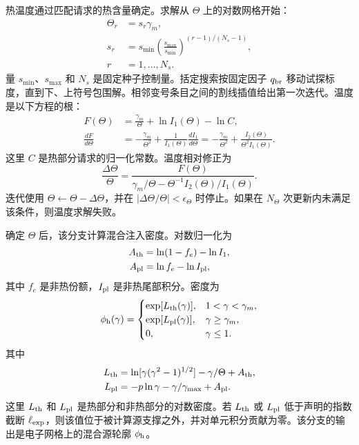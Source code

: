 \documentclass[twocolumn]{aastex702}
\begin{document}
热温度通过匹配请求的热含量确定。求解从 \(\Theta\) 上的对数网格开始：
\begin{equation}
\begin{aligned}
\Theta_r&=s_r\gamma_m,\\
s_r&=s_{\min}
\left(\frac{s_{\max}}{s_{\min}}\right)^{(r-1)/(N_s-1)},\\
r&=1,\ldots,N_s .
\end{aligned}
\end{equation}
量 \(s_{\min}\)、\(s_{\max}\) 和 \(N_s\) 是固定种子控制量。括定搜索按固定因子 \(q_{\rm br}\) 移动试探标度，直到下、上符号包围解。相邻变号条目之间的割线插值给出第一次迭代。温度是以下方程的根：
\begin{equation}
\begin{aligned}
F(\Theta)&=\frac{\gamma_m}{\Theta}+\ln I_1(\Theta)-\ln C,\\
\frac{dF}{d\Theta}
&=-\frac{\gamma_m}{\Theta^2}
+\frac{1}{I_1(\Theta)}\frac{dI_1}{d\Theta}
=-\frac{\gamma_m}{\Theta^2}+\frac{I_2(\Theta)}{\Theta^2I_1(\Theta)} .
\end{aligned}
\end{equation}
这里 \(C\) 是热部分请求的归一化常数。温度相对修正为
\begin{equation}
\frac{\Delta\Theta}{\Theta}
=\frac{F(\Theta)}
{\gamma_m/\Theta-\Theta^{-1}I_2(\Theta)/I_1(\Theta)} .
\end{equation}
迭代使用 \(\Theta\leftarrow\Theta-\Delta\Theta\)，并在 \(|\Delta\Theta/\Theta|<\epsilon_\Theta\) 时停止。如果在 \(N_\Theta\) 次更新内未满足该条件，则温度求解失败。

确定 \(\Theta\) 后，该分支计算混合注入密度。对数归一化为
\begin{equation}
\begin{aligned}
A_{\rm th}&=\ln(1-f_e)-\ln I_1,\\
A_{\rm pl}&=\ln f_e-\ln I_{\rm pl},
\end{aligned}
\end{equation}
其中 \(f_e\) 是非热份额，\(I_{\rm pl}\) 是非热尾部积分。密度为
\begin{equation}
\phi_{\rm h}(\gamma)=
\begin{cases}
\exp[L_{\rm th}(\gamma)],
&1<\gamma<\gamma_m,\\
\exp[L_{\rm pl}(\gamma)],
&\gamma\ge\gamma_m,\\
0,&\gamma\le1.
\end{cases}
\end{equation}
其中
\begin{equation}
\begin{aligned}
L_{\rm th}&=\ln[\gamma(\gamma^2-1)^{1/2}]
-\gamma/\Theta+A_{\rm th},\\
L_{\rm pl}&=-p\ln\gamma-\gamma/\gamma_{\max}+A_{\rm pl}.
\end{aligned}
\end{equation}
这里 \(L_{\rm th}\) 和 \(L_{\rm pl}\) 是热部分和非热部分的对数密度。若 \(L_{\rm th}\) 或 \(L_{\rm pl}\) 低于声明的指数截断 \(\ell_{\rm exp}\)，则该值位于被计算源支撑之外，并对单元积分贡献为零。该分支的输出是电子网格上的混合源轮廓 \(\phi_{\rm h}\)。
\end{document}
